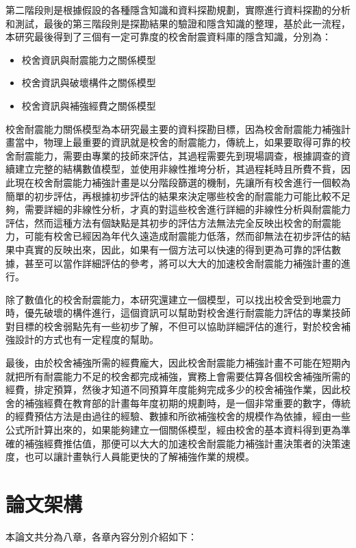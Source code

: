 第二階段則是根據假設的各種隱含知識和資料探勘規劃，實際進行資料探勘的分析和測試，最後的第三階段則是探勘結果的驗證和隱含知識的整理，基於此一流程，本研究最後得到了三個有一定可靠度的校舍耐震資料庫的隱含知識，分別為：

\begin{itemize}
\item 校舍資訊與耐震能力之關係模型
\item 校舍資訊與破壞構件之關係模型
\item 校舍資訊與補強經費之關係模型
\end{itemize}

校舍耐震能力關係模型為本研究最主要的資料探勘目標，因為校舍耐震能力補強計畫當中，物理上最重要的資訊就是校舍的耐震能力，傳統上，如果要取得可靠的校舍耐震能力，需要由專業的技師來評估，其過程需要先到現場調查，根據調查的資續建立完整的結構數值模型，並使用非線性推垮分析，其過程耗時且所費不貲，因此現在校舍耐震能力補強計畫是以分階段篩選的機制，先讓所有校舍進行一個較為簡單的初步評估，再根據初步評估的結果來決定哪些校舍的耐震能力可能比較不足夠，需要詳細的非線性分析，才真的對這些校舍進行詳細的非線性分析與耐震能力評估，然而這種方法有個缺點是其初步的評估方法無法完全反映出校舍的耐震能力，可能有校舍已經因為年代久遠造成耐震能力低落，然而卻無法在初步評估的結果中真實的反映出來，因此，如果有一個方法可以快速的得到更為可靠的評估數據，甚至可以當作詳細評估的參考，將可以大大的加速校舍耐震能力補強計畫的進行。

除了數值化的校舍耐震能力，本研究還建立一個模型，可以找出校舍受到地震力時，優先破壞的構件進行，這個資訊可以幫助對校舍進行耐震能力評估的專業技師對目標的校舍弱點先有一些初步了解，不但可以協助詳細評估的進行，對於校舍補強設計的方式也有一定程度的幫助。

最後，由於校舍補強所需的經費龐大，因此校舍耐震能力補強計畫不可能在短期內就把所有耐震能力不足的校舍都完成補強，實務上會需要估算各個校舍補強所需的經費，排定預算，然後才知道不同預算年度能夠完成多少的校舍補強作業，因此校舍的補強經費在教育部的計畫每年度初期的規劃時，是一個非常重要的數字，傳統的經費預估方法是由過往的經驗、數據和所欲補強校舍的規模作為依據，經由一些公式所計算出來的，如果能夠建立一個關係模型，經由校舍的基本資料得到更為準確的補強經費推估值，那便可以大大的加速校舍耐震能力補強計畫決策者的決策速度，也可以讓計畫執行人員能更快的了解補強作業的規模。

\section{論文架構}

本論文共分為八章，各章內容分別介紹如下：

